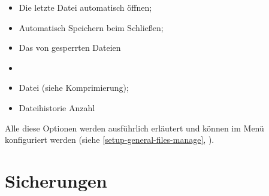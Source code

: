 \begin{itemize}
	\item Die letzte Datei automatisch öffnen;
	\item Automatisch Speichern beim Schließen;
	\item Das  von gesperrten Dateien 
	\item {}
	\item Datei  (siehe \gls{Komprimierung});
	\item Dateihistorie Anzahl
\end{itemize}

Alle diese Optionen werden ausführlich erläutert und können im Menü  konfiguriert werden (siehe \vref{setup-general-files-manage}, ).

\section{Sicherungen\label{datamanagement-backups}}%

